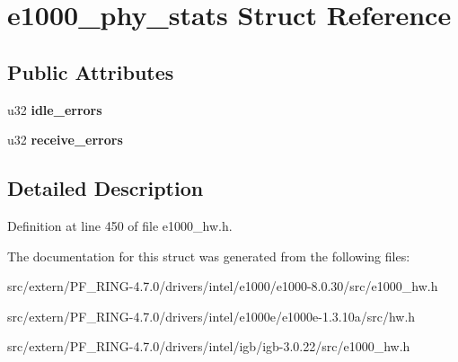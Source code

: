 \hypertarget{structe1000__phy__stats}{
\section{e1000\_\-phy\_\-stats Struct Reference}
\label{structe1000__phy__stats}
}
\subsection*{Public Attributes}
\begin{DoxyCompactItemize}
\item 
\hypertarget{structe1000__phy__stats_a891662dbd68c719cbd113431ec2fc659}{
u32 {\bfseries idle\_\-errors}}
\label{structe1000__phy__stats_a891662dbd68c719cbd113431ec2fc659}

\item 
\hypertarget{structe1000__phy__stats_ac2ee0e298836e4bfa06653c44f0823b7}{
u32 {\bfseries receive\_\-errors}}
\label{structe1000__phy__stats_ac2ee0e298836e4bfa06653c44f0823b7}

\end{DoxyCompactItemize}


\subsection{Detailed Description}


Definition at line 450 of file e1000\_\-hw.h.



The documentation for this struct was generated from the following files:\begin{DoxyCompactItemize}
\item 
src/extern/PF\_\-RING-\/4.7.0/drivers/intel/e1000/e1000-\/8.0.30/src/e1000\_\-hw.h\item 
src/extern/PF\_\-RING-\/4.7.0/drivers/intel/e1000e/e1000e-\/1.3.10a/src/hw.h\item 
src/extern/PF\_\-RING-\/4.7.0/drivers/intel/igb/igb-\/3.0.22/src/e1000\_\-hw.h\end{DoxyCompactItemize}
